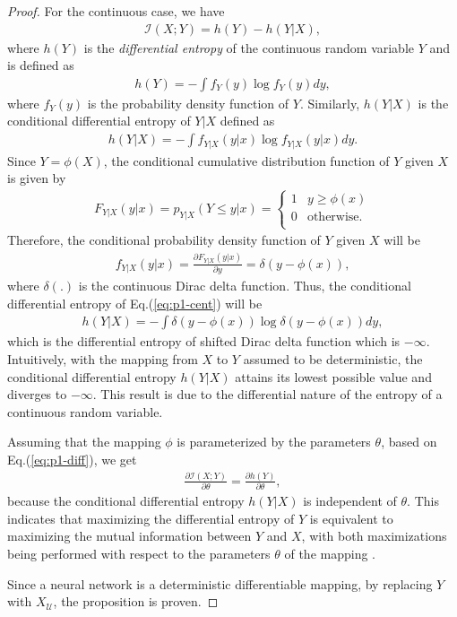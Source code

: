 \documentclass{article}
\begin{document}
\begin{proof}
	For the continuous case, we have
	\begin{gather}\label{eq:p1-diff}
		\mathcal{I}(X;Y) = h(Y) - h(Y|X),
	\end{gather}
	where $h(Y)$ is the \textit{differential entropy} of the continuous random variable $Y$ and is defined as
	\begin{gather}
		h(Y) = -\int f_Y(y)\log f_Y(y)dy,
	\end{gather}
	where $f_Y(y)$ is the probability density function of $Y$. Similarly, $h(Y|X)$ is the conditional differential entropy of $Y|X$ defined as
	\begin{gather}\label{eq:p1-cent}
		h(Y|X) = -\int f_{Y|X}(y|x)\log f_{Y|X}(y|x)dy.
	\end{gather}
	Since $Y = \phi(X)$, the conditional cumulative distribution function of $Y$ given $X$ is given by
	\begin{gather}
		F_{Y|X}(y|x) = p_{Y|X}(Y \leq y| x) = \left\{\begin{array}{lr}
			1 & y \geq \phi(x)\\
			0 & \text{otherwise}.\\
		\end{array}
		\right.
	\end{gather}
	Therefore, the conditional probability density function of $Y$ given $X$ will be
	\begin{gather}
		f_{Y|X}(y|x) = \frac{\partial F_{Y|X}(y|x)}{\partial y} = \delta(y - \phi(x)),
	\end{gather}
	where $\delta(.)$ is the continuous Dirac delta function. Thus, the conditional differential entropy of Eq.(\ref{eq:p1-cent}) will be
	\begin{gather}
		h(Y|X) = -\int \delta(y - \phi(x))\log \delta(y - \phi(x))dy,
	\end{gather}
	which is the differential entropy of shifted Dirac delta function which is $-\infty$. Intuitively, with the mapping from $X$ to $Y$ assumed to be deterministic, the conditional differential entropy $h(Y|X)$ attains its lowest possible value and diverges to $-\infty$. This result is due to the differential nature of the entropy of a continuous random variable.
	
	Assuming that the mapping $\phi$ is parameterized by the parameters $\theta$, based on Eq.(\ref{eq:p1-diff}), we get
	\begin{gather}
		\frac{\partial \mathcal{I}(X;Y)}{\partial \theta} = \frac{\partial h(Y)}{\partial \theta},
	\end{gather}
	because the conditional differential entropy $h(Y|X)$ is independent of $\theta$. This indicates that maximizing the differential entropy of $Y$ is equivalent to maximizing the mutual information between $Y$ and $X$, with both maximizations being performed with respect to the parameters $\theta$ of the mapping \cite{haykin, infomax}.
	
	Since a neural network is a deterministic differentiable mapping, by replacing $Y$ with $X_\mathcal{U}$, the proposition is proven.
\end{proof}
\end{document}
